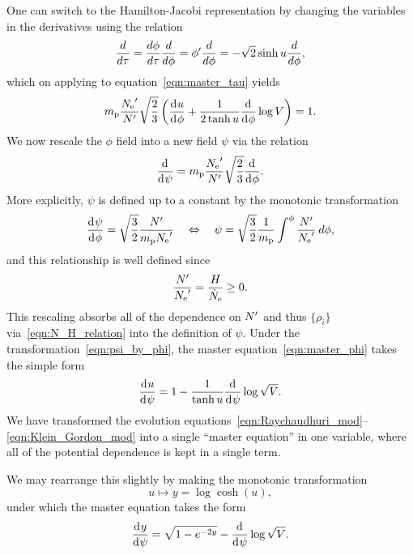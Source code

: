 One can switch to the Hamilton-Jacobi representation by changing the variables in the derivatives using the relation 
%
\begin{equation}
  \frac{d }{d \tau}
  =
  \frac{d \phi}{d \tau}\frac{d }{d \phi}
  =
  {{\phi}^\prime}\frac{d }{d \phi}
  =
  -\sqrt{2}\sinh u \frac{d }{d \phi},
  \label{eqn:tautrans}
\end{equation}
%
which on applying to equation~\eqref{eqn:master_tau} yields
%
\begin{equation}
  m_{\mathrm{p}}\frac{{{N_\mathrm{e}}^\prime}}{{{N}^\prime}} \sqrt{\frac{2}{3}}
  \left(\frac{\operatorname{d}^{}\!{u}}{\operatorname{d}^{}\!{\phi}} 
  + \frac{1}{2\tanh u} \frac{\operatorname{d}^{}\!{}}{\operatorname{d}^{}\!{\phi}}\log V\right) 
  = 
  1.
  \label{eqn:master_phi}
\end{equation}
%
We now  rescale the $\phi$ field into a new field $\psi$ via the relation
%
\begin{equation}
  \frac{\operatorname{d}^{}\!{}}{\operatorname{d}^{}\!{\psi}} 
  = 
  m_{\mathrm{p}}\frac{{{N_\mathrm{e}}^\prime}}{{{N}^\prime}}\sqrt{\frac{2}{3}}\frac{\operatorname{d}^{}\!{}}{\operatorname{d}^{}\!{\phi}}.
\end{equation}
%
More explicitly, $\psi$ is defined up to a constant by the monotonic transformation
%
\begin{equation}
  \frac{\operatorname{d}^{}\!{\psi}}{\operatorname{d}^{}\!{\phi}} 
  = 
  \sqrt{\frac{3}{2}}\frac{{{N}^\prime}}{m_{\mathrm{p}}{{N_\mathrm{e}}^\prime}} 
  \quad
  \Leftrightarrow\quad \psi 
  = 
  \sqrt{\frac{3}{2}}\frac{1}{m_{\mathrm{p}}}\int^\phi 
  \frac{{{N}^\prime}}{{{N_\mathrm{e}}^\prime}}\:d\phi,
  \label{eqn:psi_by_phi}
\end{equation}
%
and this relationship is well defined since 
%
\begin{equation}
	\frac{{{N}^\prime}}{{{N_\mathrm{e}}^\prime}} = \frac{H}{\dot{N}_\mathrm{e}} \ge 0.
\end{equation}
%
This rescaling absorbs all of the dependence on ${{N}^\prime}$ and thus $\{\rho_i\}$ via~\eqref{eqn:N_H_relation} into the definition of $\psi$. Under the transformation~\eqref{eqn:psi_by_phi}, the master equation~\eqref{eqn:master_phi} takes the simple form
%
\begin{equation}
  \frac{\operatorname{d}^{}\!{u}}{\operatorname{d}^{}\!{\psi}}  
  = 
  1-\frac{1}{\tanh u} \frac{\operatorname{d}^{}\!{}}{\operatorname{d}^{}\!{\psi}}\log \sqrt V.
\end{equation}
%
We have transformed the evolution equations~\eqref{eqn:Raychaudhuri_mod}--\eqref{eqn:Klein_Gordon_mod} into a single ``master equation'' in one variable, where all of the potential dependence is kept in a single term.

We may rearrange this slightly by making the monotonic transformation
%
\begin{equation}
  u\mapsto y = \log\cosh(u), 
  \label{eqn:y_def}
\end{equation}
%
under which the master equation takes the form
%
\begin{equation}
  \frac{\operatorname{d}^{}\!{y}}{\operatorname{d}^{}\!{\psi}} = \sqrt{1-e^{-2y}} - \frac{\operatorname{d}^{}\!{}}{\operatorname{d}^{}\!{\psi}}\log \sqrt V.
  \label{eqn:master_eq}
\end{equation}
%

